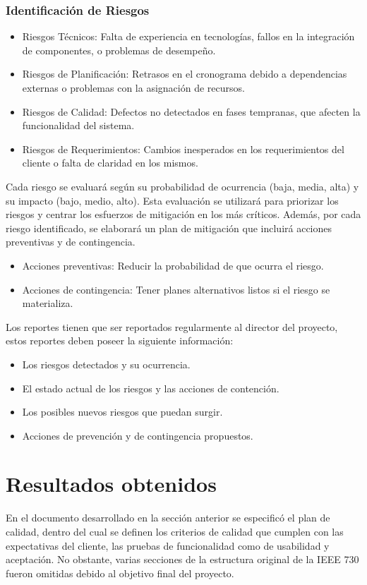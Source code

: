 \documentclass[a4paper,10pt]{article}
\begin{document}
	\subsubsection{Identificación de Riesgos}
	\begin{itemize}
		\item Riesgos Técnicos: Falta de experiencia en tecnologías, fallos en la integración de componentes, o problemas de desempeño.
		\item Riesgos de Planificación: Retrasos en el cronograma debido a dependencias externas o problemas con la asignación de recursos.
		\item Riesgos de Calidad: Defectos no detectados en fases tempranas, que afecten la funcionalidad del sistema.
		\item Riesgos de Requerimientos: Cambios inesperados en los requerimientos del cliente o falta de claridad en los mismos.
	\end{itemize}
	
	Cada riesgo se evaluará según su probabilidad de ocurrencia (baja, media, alta) y su impacto (bajo, medio, alto). Esta evaluación se utilizará para priorizar los riesgos y centrar los esfuerzos de mitigación en los más críticos. Además, por cada riesgo identificado, se elaborará un plan de mitigación que incluirá acciones preventivas y de contingencia.
	
	\begin{itemize}
		\item Acciones preventivas: Reducir la probabilidad de que ocurra el riesgo.
		\item Acciones de contingencia: Tener planes alternativos listos si el riesgo se materializa.
	\end{itemize}
	
	Los reportes tienen que ser reportados regularmente al director del proyecto, estos reportes deben poseer la siguiente información:
	\begin{itemize}
		\item Los riesgos detectados y su ocurrencia.
		\item El estado actual de los riesgos y las acciones de contención.
		\item Los posibles nuevos riesgos que puedan surgir.
		\item Acciones de prevención y de contingencia propuestos.
	\end{itemize}
	
	\section{Resultados obtenidos}
	En el documento desarrollado en la sección anterior se especificó el plan de calidad, dentro del cual se definen los criterios de calidad que cumplen con las expectativas del cliente, las pruebas de funcionalidad como de usabilidad y aceptación. No obstante, varias secciones de la estructura original de la IEEE 730 fueron omitidas debido al objetivo final del proyecto.
	
\end{document}
